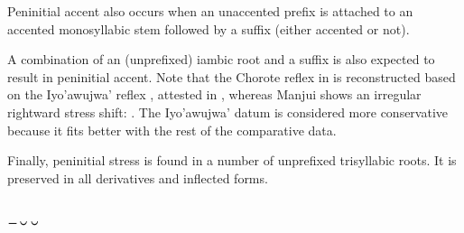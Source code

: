 \begin{exe}
    \ex \rightn
    \ex \disease
    \ex \spitcw
    \ex \sisinlaw
    \ex \soninlaw \label{amph-soninlaw}
    \ex \dreamn
    \ex \dreamv
    \ex \welln \label{amph-welln}
    \ex \grandchild
    \ex \neighbor
    \ex \arrowkaxe \label{amph-arrow}
    \ex \spouse
    \ex \dividev
    \ex \youngerbro
    \ex \youngersis \label{amph-youngersis}
    \ex \smellv
    \ex \heel
    \ex \lippaset
    \ex \hear \label{amph-hear}
    \ex \full
    \ex \fillv
    \ex \distrust \label{amph-distrust}
    \ex \belt
    \ex \yellowv
    \ex \fishwithhook
    \ex \noden
    \ex \dinlaw
    \ex \acquainted
    \ex \eyelash \label{amph-eyelash}
    \ex \bilecw
    \ex \rheum
    \ex \tooth
    \ex \leafhaircw
    \ex \egg
    \ex \headn
    \ex \temperance
\end{exe}

Peninitial accent also occurs when an unaccented prefix is attached to an accented monosyllabic stem followed by a suffix (either accented or not).

\begin{exe}
    \ex \fall
    \ex \grabwork
    \ex \meet
    \ex \coverappl
    \ex \costumepl
    \ex \bloodpl
    \ex \saber
\end{exe}

A combination of an (unprefixed) iambic root and a suffix is also expected to result in peninitial accent. Note that the Chorote reflex in  is reconstructed based on the Iyo'awujwa' reflex , attested in \citet[132]{AG83}, whereas Manjui shows an irregular rightward stress shift: . The Iyo'awujwa' datum is considered more conservative because it fits better with the rest of the comparative data.

\begin{exe}
    \ex \algarrobot
    \ex \waterpl
    \ex \thorncutjanpl \label{iteneis}
    \ex \chajapl
\end{exe}

Finally, peninitial stress is found in a number of unprefixed trisyllabic roots. It is preserved in all derivatives and inflected forms.

\begin{exe}
    \ex \durmili
    \ex \tuscaf
    \ex \tuscat
    \ex \tuscag
    \ex \caracara
    \ex \wildhoney
    \ex \mistolf
    \ex \mistolt
    \ex \widower
    \ex \puma
    \ex \lessergrison
\end{exe}

\subsection{¯˘˘}  \label{larga-corta-corta}

